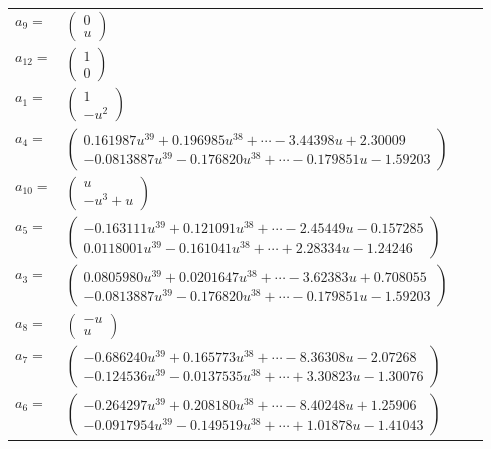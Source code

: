 \documentclass[1p]{elsarticle_modified}
\theoremstyle{definition}
\begin{document}
\begin{tabular}{m{7pt} m{180pt} m{7pt} m{180pt} }
\flushright $a_{9}=$&$\begin{pmatrix}0\\u\end{pmatrix}$ \\
\flushright $a_{12}=$&$\begin{pmatrix}1\\0\end{pmatrix}$ \\
\flushright $a_{1}=$&$\begin{pmatrix}1\\- u^2\end{pmatrix}$ \\
\flushright $a_{4}=$&$\begin{pmatrix}0.161987 u^{39}+0.196985 u^{38}+\cdots-3.44398 u+2.30009\\-0.0813887 u^{39}-0.176820 u^{38}+\cdots-0.179851 u-1.59203\end{pmatrix}$ \\
\flushright $a_{10}=$&$\begin{pmatrix}u\\- u^3+u\end{pmatrix}$ \\
\flushright $a_{5}=$&$\begin{pmatrix}-0.163111 u^{39}+0.121091 u^{38}+\cdots-2.45449 u-0.157285\\0.0118001 u^{39}-0.161041 u^{38}+\cdots+2.28334 u-1.24246\end{pmatrix}$ \\
\flushright $a_{3}=$&$\begin{pmatrix}0.0805980 u^{39}+0.0201647 u^{38}+\cdots-3.62383 u+0.708055\\-0.0813887 u^{39}-0.176820 u^{38}+\cdots-0.179851 u-1.59203\end{pmatrix}$ \\
\flushright $a_{8}=$&$\begin{pmatrix}- u\\u\end{pmatrix}$ \\
\flushright $a_{7}=$&$\begin{pmatrix}-0.686240 u^{39}+0.165773 u^{38}+\cdots-8.36308 u-2.07268\\-0.124536 u^{39}-0.0137535 u^{38}+\cdots+3.30823 u-1.30076\end{pmatrix}$ \\
\flushright $a_{6}=$&$\begin{pmatrix}-0.264297 u^{39}+0.208180 u^{38}+\cdots-8.40248 u+1.25906\\-0.0917954 u^{39}-0.149519 u^{38}+\cdots+1.01878 u-1.41043\end{pmatrix}$ \\

\end{tabular}
\end{document}
